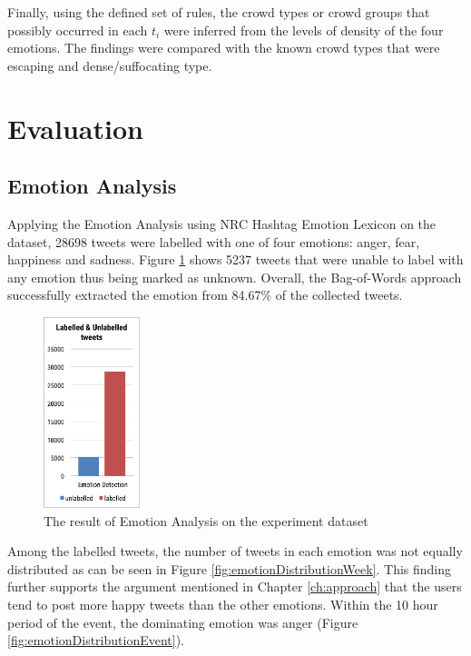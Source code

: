 Finally, using the defined set of rules, the crowd types or crowd groups that possibly occurred in each \(t_i\) were inferred from the levels of density of the four emotions. The findings were compared with the known crowd types that were escaping and dense/suffocating type.

\section{Evaluation}
\subsection{Emotion Analysis}

Applying the Emotion Analysis using NRC Hashtag Emotion Lexicon \citep{mohammad2014using} on the dataset, 28698 tweets were labelled with one of four emotions: anger, fear, happiness and sadness. Figure \ref{fig:emotionLabel} shows 5237 tweets that were unable to label with any emotion thus being marked as unknown. Overall, the Bag-of-Words approach successfully extracted the emotion from 84.67\% of the collected tweets.

\begin{figure}[htb!] 
\centering    
\includegraphics[width=0.25\textwidth]{EmotionLabel}
\caption{The result of Emotion Analysis on the experiment dataset}
\label{fig:emotionLabel}
\end{figure}

Among the labelled tweets, the number of tweets in each emotion was not equally distributed as can be seen in Figure \ref{fig:emotionDistributionWeek}. This finding further supports the argument mentioned in Chapter \ref{ch:approach} that the users tend to post more happy tweets than the other emotions. Within the 10 hour period of the event, the dominating emotion was anger (Figure \ref{fig:emotionDistributionEvent}).

